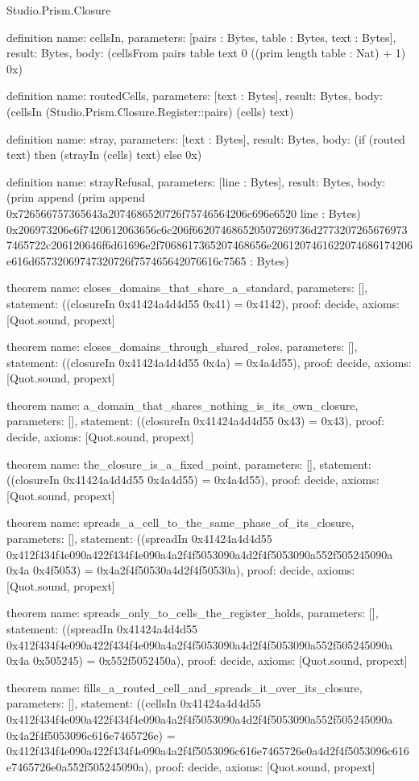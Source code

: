 \begin{lexlean}{Studio.Prism.Closure}
\begin{semanticmodule}
definition{
  name: cellsIn,
  parameters: [pairs : Bytes, table : Bytes, text : Bytes],
  result: Bytes,
  body: (cellsFrom pairs table text 0 ((prim length table : Nat) + 1) 0x)
}

definition{
  name: routedCells,
  parameters: [text : Bytes],
  result: Bytes,
  body: (cellsIn (Studio.Prism.Closure.Register::pairs) (cells) text)
}

definition{
  name: stray,
  parameters: [text : Bytes],
  result: Bytes,
  body: (if (routed text) then (strayIn (cells) text) else 0x)
}

definition{
  name: strayRefusal,
  parameters: [line : Bytes],
  result: Bytes,
  body: (prim append (prim append 0x726566757365643a2074686520726f75746564206c696e6520 line : Bytes) 0x206973206e6f7420612063656c6c206f662074686520507269736d27732072656769737465722c206120646f6d61696e2f7068617365207468656e2061207461622074686174206e616d65732069747320726f757465642076616c7565 : Bytes)
}

theorem{
  name: closes_domains_that_share_a_standard,
  parameters: [],
  statement: ((closureIn 0x41424a4d4d55 0x41) = 0x4142),
  proof: decide{},
  axioms: [Quot.sound, propext]
}

theorem{
  name: closes_domains_through_shared_roles,
  parameters: [],
  statement: ((closureIn 0x41424a4d4d55 0x4a) = 0x4a4d55),
  proof: decide{},
  axioms: [Quot.sound, propext]
}

theorem{
  name: a_domain_that_shares_nothing_is_its_own_closure,
  parameters: [],
  statement: ((closureIn 0x41424a4d4d55 0x43) = 0x43),
  proof: decide{},
  axioms: [Quot.sound, propext]
}

theorem{
  name: the_closure_is_a_fixed_point,
  parameters: [],
  statement: ((closureIn 0x41424a4d4d55 0x4a4d55) = 0x4a4d55),
  proof: decide{},
  axioms: [Quot.sound, propext]
}

theorem{
  name: spreads_a_cell_to_the_same_phase_of_its_closure,
  parameters: [],
  statement: ((spreadIn 0x41424a4d4d55 0x412f434f4e090a422f434f4e090a4a2f4f5053090a4d2f4f5053090a552f505245090a 0x4a 0x4f5053) = 0x4a2f4f50530a4d2f4f50530a),
  proof: decide{},
  axioms: [Quot.sound, propext]
}

theorem{
  name: spreads_only_to_cells_the_register_holds,
  parameters: [],
  statement: ((spreadIn 0x41424a4d4d55 0x412f434f4e090a422f434f4e090a4a2f4f5053090a4d2f4f5053090a552f505245090a 0x4a 0x505245) = 0x552f5052450a),
  proof: decide{},
  axioms: [Quot.sound, propext]
}

theorem{
  name: fills_a_routed_cell_and_spreads_it_over_its_closure,
  parameters: [],
  statement: ((cellsIn 0x41424a4d4d55 0x412f434f4e090a422f434f4e090a4a2f4f5053090a4d2f4f5053090a552f505245090a 0x4a2f4f5053096c616e7465726e) = 0x412f434f4e090a422f434f4e090a4a2f4f5053096c616e7465726e0a4d2f4f5053096c616e7465726e0a552f505245090a),
  proof: decide{},
  axioms: [Quot.sound, propext]
}


\end{semanticmodule}
\end{lexlean}
